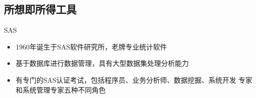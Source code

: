 \documentclass{beamerthemeMono}
\begin{document}
\subsection{所想即所得工具}
\begin{frame}[t]{\subsecname}{SAS}
  \begin{itemize}
     \item 1960年诞生于SAS软件研究所，老牌专业统计软件
     \item 基于数据库进行数据管理，具有大型数据集处理分析能力
     \item 有专门的SAS认证考试，包括程序员、业务分析师、数据挖掘、系统开发
           专家和系统管理专家五种不同角色
  \end{itemize}
  
  \begin{overlayarea} {\textwidth}{\textheight}
  \end{overlayarea}
\end{frame}
\end{document}
